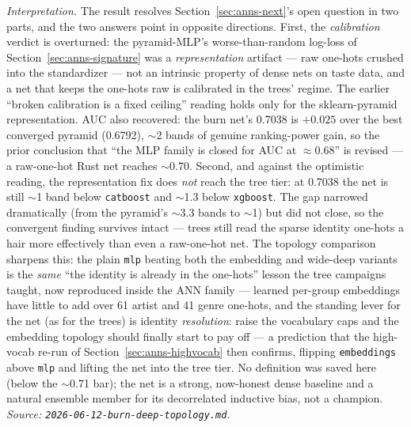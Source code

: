 \documentclass[11pt]{article}
\begin{document}
\emph{Interpretation.} The result resolves Section~\ref{sec:anns-next}'s open
question in two parts, and the two answers point in opposite directions. First,
the \emph{calibration} verdict is overturned: the pyramid-MLP's worse-than-random
log-loss of Section~\ref{sec:anns-signature} was a \emph{representation} artifact
--- raw one-hots crushed into the standardizer --- not an intrinsic property of
dense nets on taste data, and a net that keeps the one-hots raw is calibrated in
the trees' regime. The earlier ``broken calibration is a fixed ceiling'' reading
holds only for the sklearn-pyramid representation. AUC also recovered: the burn
net's \num{0.7038} is $+0.025$ over the best converged pyramid (\num{0.6792}),
$\sim$2 bands of genuine ranking-power gain, so the prior conclusion that ``the
MLP family is closed for AUC at $\approx 0.68$'' is revised --- a raw-one-hot
Rust net reaches $\sim$0.70. Second, and against the optimistic reading, the
representation fix does \emph{not} reach the tree tier: at \num{0.7038} the net is
still $\sim$1 band below \texttt{catboost} and $\sim$1.3 below \texttt{xgboost}.
The gap narrowed dramatically (from the pyramid's $\sim$3.3 bands to $\sim$1) but
did not close, so the convergent finding survives intact --- trees still read the
sparse identity one-hots a hair more effectively than even a raw-one-hot net. The
topology comparison sharpens this: the plain \texttt{mlp} beating both the
embedding and wide-deep variants is the \emph{same} ``the identity is already in
the one-hots'' lesson the tree campaigns taught, now reproduced inside the ANN
family --- learned per-group embeddings have little to add over 61 artist and 41
genre one-hots, and the standing lever for the net (as for the trees) is identity
\emph{resolution}: raise the vocabulary caps and the embedding topology should
finally start to pay off --- a prediction that the high-vocab re-run of
Section~\ref{sec:anns-highvocab} then confirms, flipping \texttt{embeddings}
above \texttt{mlp} and lifting the net into the tree tier. No definition was
saved here (below the $\sim$0.71 bar); the
net is a strong, now-honest dense baseline and a natural ensemble member for its
decorrelated inductive bias, not a champion.
\emph{Source: \texttt{2026-06-12-burn-deep-topology.md}.}
\end{document}
